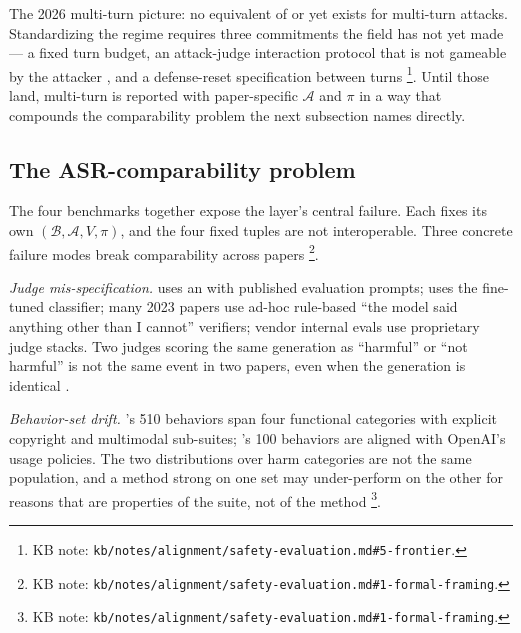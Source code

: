 The 2026 multi-turn picture: no equivalent of  or
 yet exists for multi-turn attacks. Standardizing
the regime requires three commitments the field has not yet made
--- a fixed turn budget, an attack-judge interaction protocol
that is not gameable by the attacker , and a defense-reset
specification between turns%
\footnote{KB note: \nolinkurl{kb/notes/alignment/safety-evaluation.md#5-frontier}.}.
Until those land, multi-turn  is reported with paper-specific
$\mathcal{A}$ and $\pi$ in a way that compounds the comparability
problem the next subsection names directly.

\subsection{The ASR-comparability problem}
\label{sec:safety-asr-comparability}

The four benchmarks together expose the layer's central failure.
Each fixes its own $(\mathcal{B}, \mathcal{A}, V, \pi)$, and the
four fixed tuples are not interoperable. Three concrete failure
modes break  comparability across papers%
\footnote{KB note: \nolinkurl{kb/notes/alignment/safety-evaluation.md#1-formal-framing}.}.

\emph{Judge mis-specification.}  uses an 
with published evaluation prompts;  uses the fine-tuned
 classifier; many 2023 papers use ad-hoc rule-based
``the model said anything other than I cannot'' verifiers; vendor
internal evals use proprietary judge stacks. Two judges scoring the
same generation as ``harmful'' or ``not harmful'' is not the same
event in two papers, even when the generation is identical
\citep[\S{}abstract]{chao2024-jailbreakbench}.

\emph{Behavior-set drift.} 's 510 behaviors span four
functional categories with explicit copyright and multimodal
sub-suites; 's 100 behaviors are aligned with OpenAI's
usage policies. The two distributions over harm categories are
not the same population, and a method strong on one set may
under-perform on the other for reasons that are properties of the
suite, not of the method%
\footnote{KB note: \nolinkurl{kb/notes/alignment/safety-evaluation.md#1-formal-framing}.}.

